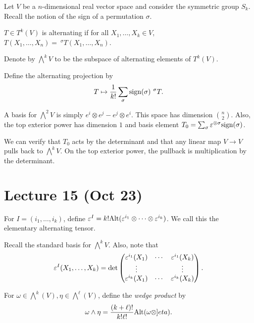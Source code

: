 \documentclass[twoside, 10pt]{article}
\begin{document}
    Let $V$ be a $n$-dimensional real vector space and consider the symmetric group $S_k$. Recall the notion of the sign of a permutation $\sigma$. 

    \begin{defn}
        $T \in T^k(V)$ is alternating if for all $X_1, \ldots,X_k \in V$, $T(X_1, \ldots, X_n) =\ ^{\sigma}T(X_1, \ldots, X_n)$.
    \end{defn}

    Denote by $\bigwedge^kV$ to be the subspace of alternating elements of $T^k(V)$.

    \begin{defn}
        Define the alternating projection by
        \[ T \mapsto \frac{1}{k!} \sum_{\sigma} \mr{sign}(\sigma)\ ^{\sigma}T.\]
    \end{defn}

    A basis for $\bigwedge^2V$ is simply $e^i \otimes e^j - e^j \otimes e^i$. This space has dimension $\binom{n}{2}$. Also, the top exterior power has dimension $1$ and basis element $T_0 = \sum_{\sigma} \varepsilon^{\otimes \sigma} \mathrm{sign}(\sigma)$.

    We can verify that $T_0$ acts by the determinant and that any linear map $V \to V$ pulls back to $\bigwedge^kV$. On the top exterior power, the pullback is multiplication by the determinant.
    
    \section{Lecture 15 (Oct 23)}%
    \label{sec:lecture_15_oct_23_}
    
    \begin{notn}
        For $I = (i_1, \ldots, i_k)$, define $\varepsilon^I = k! \mathrm{Alt}(\varepsilon^{i_1} \otimes \cdots \otimes \varepsilon^{i_k})$. We call this the elementary alternating tensor.
    \end{notn}

    Recall the standard basis for $\bigwedge^k V$. Also, note that
    \[ \varepsilon^I(X_1, \ldots, X_k) = \det \begin{pmatrix}
        \varepsilon^{i_1}(X_1) & \cdots & \varepsilon^{i_1}(X_k) \\
        \vdots & & \vdots \\
        \varepsilon^{i_k}(X_1) & \cdots & \varepsilon^{i_k}(X_k)
    \end{pmatrix}. \]

    \begin{defn}
        For $\omega \in \bigwedge^k(V), \eta \in \bigwedge^{\ell}(V)$, define the \textit{wedge product} by
        \[ \omega \wedge \eta = \frac{(k+\ell)!}{k!\ell !} \mathrm{Alt}(\omega \otimes ]eta).\]
    \end{defn}
\end{document}
